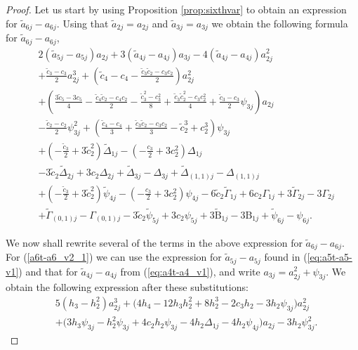 \begin{proof}
Let us start by using Proposition \ref{prop:sixthvar} to obtain an expression for $\tilde{a}_{6j}-a_{6j}$. Using that  $\tilde{a}_{2j}=a_{2j}$ and $\tilde{a}_{3j}=a_{3j}$ we obtain the following formula for $\tilde{a}_{6j}-a_{6j}$,
\begin{align}
&  2(\tilde{a}_{5j}-a_{5j})a_{2j}+3(\tilde{a}_{4j}-a_{4j})a_{3j}-4(\tilde{a}_{4j}-a_{4j})a_{2j}^2 \label{a6t-a6_v2_1} \\
& +\frac{\tilde{c}_3-c_3}{2}a_{2j}^3+\left(\tilde{c}_4-c_4-\frac{\tilde{c}_3\tilde{c}_2-c_3c_2}{2}\right)a_{2j}^2 \label{a6t-a6_v2_2} \\
& +\left(\frac{3\tilde{c}_5-3c_5}{4}-\frac{\tilde{c}_4\tilde{c}_2-c_4c_2}{2}-\frac{\tilde{c}_3^2-c_3^2}{8}+\frac{\tilde{c}_3\tilde{c}_2^2-c_3c_2^2}{4}+\frac{\tilde{c}_3-c_3}{2}\psi_{3j}\right)a_{2j} \label{a6t-a6_v2_3} \\
& -\frac{\tilde{c}_2-c_2}{2}\psi_{3j}^2+\left(\frac{\tilde{c}_4-c_4}{3}+\frac{\tilde{c}_3\tilde{c}_2-c_3c_2}{3}-\tilde{c}_2^3+c_2^3\right)\psi_{3j} \label{a6t-a6_v2_4} \\
& +\left(-\frac{\tilde{c}_3}{2}+3\tilde{c}_2^2\right)\widetilde{\Delta}_{1j}-\left(-\frac{c_3}{2}+3c_2^2\right)\Delta_{1j} \label{a6t-a6_v2_5} \\
& -3\tilde{c}_2\widetilde{\Delta}_{2j}+3c_2\Delta_{2j} +\widetilde{\Delta}_{3j}-\Delta_{3j} +\widetilde{\Delta}_{(1,1)j}-\Delta_{(1,1)j} \label{a6t-a6_v2_6} \\
& +\left(-\frac{\tilde{c}_3}{2}+3\tilde{c}_2^2\right)\tilde{\psi}_{4j}-\left(-\frac{c_3}{2}+3c_2^2\right)\psi_{4j} -6\tilde{c}_2\widetilde{\Gamma}_{1j}+6c_2\Gamma_{1j} +3\widetilde{\Gamma}_{2j}-3\Gamma_{2j} \label{a6t-a6_v2_7} \\
& +\widetilde{\Gamma}_{(0,1)j}-\Gamma_{(0,1)j} -3\tilde{c}_2\tilde{\psi}_{5j}+3c_2\psi_{5j} +3\widetilde{\mathrm{B}}_{1j}-3\mathrm{B}_{1j} +\tilde{\psi}_{6j}-\psi_{6j}. \label{a6t-a6_v2_8}
\end{align}

We now shall rewrite several of the terms in the above expression for $\tilde{a}_{6j}-a_{6j}$. For (\ref{a6t-a6_v2_1}) we can use the expression for $\tilde{a}_{5j}-a_{5j}$ found in (\ref{eq:a5t-a5-v1}) and that for $\tilde{a}_{4j}-a_{4j}$ from (\ref{eq:a4t-a4_v1}), and write $a_{3j}=a_{2j}^2+\psi_{3j}$. We obtain the following expression after these substitutions:
\begin{align}
& 5(h_3-h_2^2)a_{2j}^3+\big(4h_4-12h_3h_2^2+8h_2^3-2c_3h_2-3h_2\psi_{3j}\big)a_{2j}^2 \nonumber \\
& +\big(3h_3\psi_{3j}-h_2^2\psi_{3j}+4c_2h_2\psi_{3j}-4h_2\Delta_{1j}-4h_2\psi_{4j}\big)a_{2j} -3h_2\psi_{3j}^2. \label{eq:Pt-P}
\end{align}


\end{proof}
